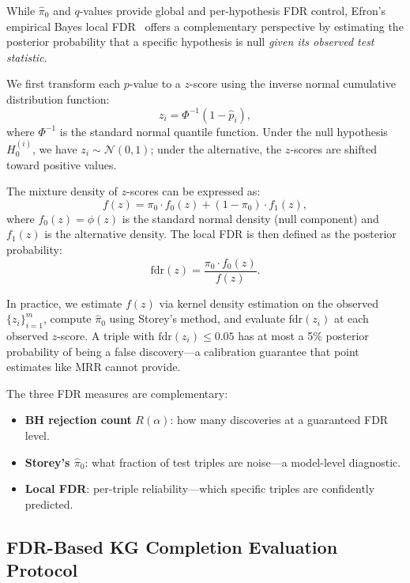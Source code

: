 While $\hat{\pi}_0$ and $q$-values provide global and per-hypothesis FDR control, Efron's empirical Bayes local FDR~\cite{efron2004large, efron2007size} offers a complementary perspective by estimating the posterior probability that a specific hypothesis is null \emph{given its observed test statistic}.

We first transform each $p$-value to a $z$-score using the inverse normal cumulative distribution function:
\begin{equation}
    z_i = \Phi^{-1}(1 - \hat{p}_i),
    \label{eq:zscore}
\end{equation}
where $\Phi^{-1}$ is the standard normal quantile function. Under the null hypothesis $H_0^{(i)}$, we have $z_i \sim \mathcal{N}(0, 1)$; under the alternative, the $z$-scores are shifted toward positive values.

The mixture density of $z$-scores can be expressed as:
\begin{equation}
    f(z) = \pi_0 \cdot f_0(z) + (1 - \pi_0) \cdot f_1(z),
    \label{eq:mixture}
\end{equation}
where $f_0(z) = \phi(z)$ is the standard normal density (null component) and $f_1(z)$ is the alternative density.
The local FDR is then defined as the posterior probability:
\begin{equation}
    \text{fdr}(z) = \frac{\pi_0 \cdot f_0(z)}{f(z)}.
    \label{eq:locfdr}
\end{equation}

In practice, we estimate $f(z)$ via kernel density estimation on the observed $\{z_i\}_{i=1}^m$, compute $\hat{\pi}_0$ using Storey's method, and evaluate $\text{fdr}(z_i)$ at each observed $z$-score.
A triple with $\text{fdr}(z_i) \leq 0.05$ has at most a 5\% posterior probability of being a false discovery---a calibration guarantee that point estimates like MRR cannot provide.

The three FDR measures are complementary:
\begin{itemize}
    \item \textbf{BH rejection count} $R(\alpha)$: how many discoveries at a guaranteed FDR level.
    \item \textbf{Storey's $\hat{\pi}_0$}: what fraction of test triples are noise---a model-level diagnostic.
    \item \textbf{Local FDR}: per-triple reliability---which specific triples are confidently predicted.
\end{itemize}

\subsection{FDR-Based KG Completion Evaluation Protocol}
\label{subsec:protocol}


